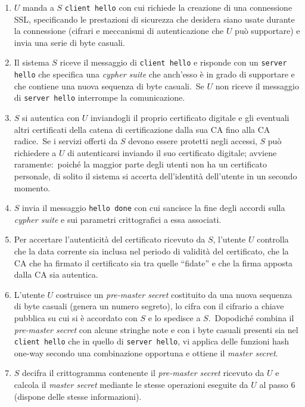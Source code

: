 \begin{enumerate}
    \item $U$ manda a $S$ \texttt{client hello} con cui richiede la creazione di una connessione SSL, specificando le prestazioni di sicurezza che desidera siano usate durante la connessione (cifrari e meccanismi di autenticazione che $U$ può supportare) e invia una serie di byte casuali.\
    \item Il sistema $S$ riceve il messaggio di \texttt{client hello} e risponde con un \texttt{server hello} che specifica una \textit{cypher suite} che anch'esso è in grado di supportare e che contiene una nuova sequenza di byte casuali.\ Se $U$ non riceve il messaggio di \texttt{server hello} interrompe la comunicazione.\
    \item $S$ si autentica con $U$ inviandogli il proprio certificato digitale e gli eventuali altri certificati della catena di certificazione dalla sua CA fino alla CA radice.\ Se i servizi offerti da $S$ devono essere protetti negli accessi, $S$ può richiedere a $U$ di autenticarsi inviando il suo certificato digitale; avviene raramente:\ poiché la maggior parte degli utenti non ha un certificato personale, di solito il sistema si accerta dell'identità dell'utente in un secondo momento.\
    \item $S$ invia il messaggio \texttt{hello done} con cui sancisce la fine degli accordi sulla \textit{cypher suite} e sui parametri crittografici a essa associati.\
    \item Per accertare l'autenticità del certificato ricevuto da $S$, l'utente $U$ controlla che la data corrente sia inclusa nel periodo di validità del certificato, che la CA che ha firmato il certificato sia tra quelle ``fidate'' e che la firma apposta dalla CA sia autentica.\
    \item L'utente $U$ costruisce un \textit{pre-master secret} costituito da una nuova sequenza di byte casuali (genera un numero segreto), lo cifra con il cifrario a chiave pubblica su cui si è accordato con $S$ e lo spedisce a $S$.\ Dopodiché combina il \textit{pre-master secret} con alcune stringhe note e con i byte casuali presenti sia nel \texttt{client hello} che in quello di \texttt{server hello}, vi applica delle funzioni hash one-way secondo una combinazione opportuna e ottiene il \textit{master secret}.\
    \item $S$ decifra il crittogramma contenente il \textit{pre-master secret} ricevuto da $U$ e calcola il \textit{master secret} mediante le stesse operazioni eseguite da $U$ al passo 6 (dispone delle stesse informazioni).\

\end{enumerate}
